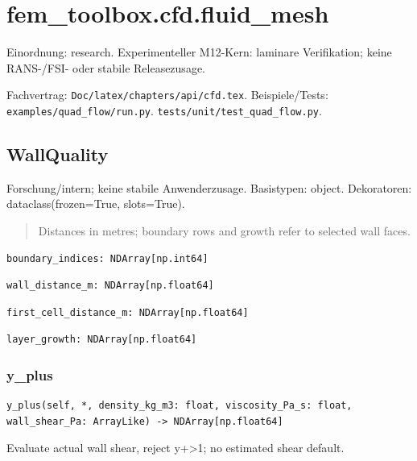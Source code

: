 \section{fem\_toolbox.cfd.fluid\_mesh}
Einordnung: research. Experimenteller M12-Kern: laminare Verifikation; keine RANS-/FSI- oder stabile Releasezusage.
\par Fachvertrag: \nolinkurl{Doc/latex/chapters/api/cfd.tex}. Beispiele/Tests:
\nolinkurl{examples/quad_flow/run.py}.
\nolinkurl{tests/unit/test_quad_flow.py}.
\subsection{WallQuality}
Forschung/intern; keine stabile Anwenderzusage.
Basistypen: object. Dekoratoren: dataclass(frozen=True, slots=True).
\begin{quote}
Distances in metres; boundary rows and growth refer to selected wall faces.
\end{quote}
\begin{lstlisting}
boundary_indices: NDArray[np.int64]
\end{lstlisting}
\begin{lstlisting}
wall_distance_m: NDArray[np.float64]
\end{lstlisting}
\begin{lstlisting}
first_cell_distance_m: NDArray[np.float64]
\end{lstlisting}
\begin{lstlisting}
layer_growth: NDArray[np.float64]
\end{lstlisting}
\subsubsection*{y\_plus}
\begin{lstlisting}
y_plus(self, *, density_kg_m3: float, viscosity_Pa_s: float, wall_shear_Pa: ArrayLike) -> NDArray[np.float64]
\end{lstlisting}
Evaluate actual wall shear, reject y+>1; no estimated shear default.
